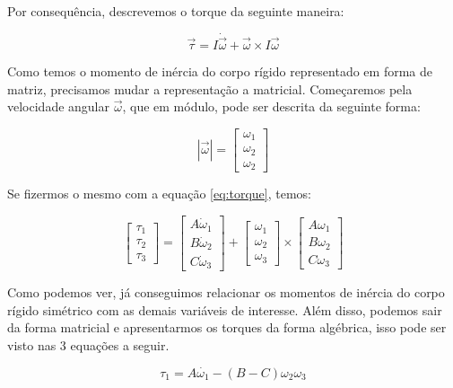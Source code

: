 Por consequência, descrevemos o torque da seguinte maneira:

\begin{equation}\label{eq:torque}
\vec{\tau}=I\dot{\vec{\omega}}+\vec{\omega}\times I \vec{\omega}
\end{equation}

Como temos o momento de inércia do corpo rígido representado em forma de matriz, precisamos mudar a representação a matricial. Começaremos pela velocidade angular $\vec{\omega}$, que em módulo, pode ser descrita da seguinte forma:

\begin{equation}
\left|\vec{\omega}\right|=\begin{bmatrix}\omega_1\\\omega_2\\\omega_2\end{bmatrix}
\end{equation}

Se fizermos o mesmo com a equação \ref{eq:torque}, temos:

\begin{equation}
\begin{bmatrix}\tau_{1}\\\tau_{2}\\\tau_{3}\end{bmatrix}=\begin{bmatrix}A\dot{\omega}_{1}\\B\dot{\omega}_{2}\\C\dot{\omega}_{3}\end{bmatrix}+\begin{bmatrix}\omega_{1}\\\omega_{2}\\\omega_{3}\end{bmatrix}\times\begin{bmatrix}A\omega_{1}\\B\omega_{2}\\C\omega_{3}\end{bmatrix}
\end{equation}

Como podemos ver, já conseguimos relacionar os momentos de inércia do corpo rígido simétrico com as demais variáveis de interesse. Além disso, podemos sair da forma matricial e apresentarmos os torques da forma algébrica, isso pode ser visto nas 3 equações a seguir.

\begin{equation}
  \tau_1=A\dot{\omega_1}-(B-C)\omega_2\omega_3 
\end{equation}

